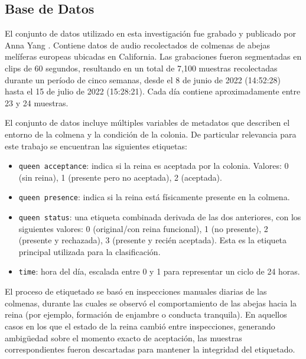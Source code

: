 \documentclass[12pt]{report}
\newenvironment{tightmulticols}{%
  \begin{multicols}{2}
  \setlength{\parskip}{0pt}
  \setlength{\parindent}{0em}
  \linespread{1}\selectfont
}{%
  \end{multicols}
}
\begin{document}
\begin{tightmulticols}
\section{Base de Datos}

\par El conjunto de datos utilizado en esta investigación fue grabado y publicado por Anna Yang \cite{AnnaYang-Dataset}. Contiene datos de audio recolectados de colmenas de abejas melíferas europeas ubicadas en California. Las grabaciones fueron segmentadas en clips de 60 segundos, resultando en un total de 7,100 muestras recolectadas durante un período de cinco semanas, desde el 8 de junio de 2022 (14:52:28) hasta el 15 de julio de 2022 (15:28:21). Cada día contiene aproximadamente entre 23 y 24 muestras.

\par El conjunto de datos incluye múltiples variables de metadatos que describen el entorno de la colmena y la condición de la colonia. De particular relevancia para este trabajo se encuentran las siguientes etiquetas:

\begin{itemize}
	\item[\ding{43}] \texttt{queen acceptance}: indica si la reina es aceptada por la colonia. Valores: 0 (sin reina), 1 (presente pero no aceptada), 2 (aceptada).
	\item[\ding{43}] \texttt{queen presence}: indica si la reina está físicamente presente en la colmena.
	\item[\ding{43}] \texttt{queen status}: una etiqueta combinada derivada de las dos anteriores, con los siguientes valores: 0 (original/con reina funcional), 1 (no presente), 2 (presente y rechazada), 3 (presente y recién aceptada). Esta es la etiqueta principal utilizada para la clasificación.
	\item[\ding{43}] \texttt{time}: hora del día, escalada entre 0 y 1 para representar un ciclo de 24 horas.
\end{itemize}

\par El proceso de etiquetado se basó en inspecciones manuales diarias de las colmenas, durante las cuales se observó el comportamiento de las abejas hacia la reina (por ejemplo, formación de enjambre o conducta tranquila). En aquellos casos en los que el estado de la reina cambió entre inspecciones, generando ambigüedad sobre el momento exacto de aceptación, las muestras correspondientes fueron descartadas para mantener la integridad del etiquetado.

\end{tightmulticols}
\end{document}
